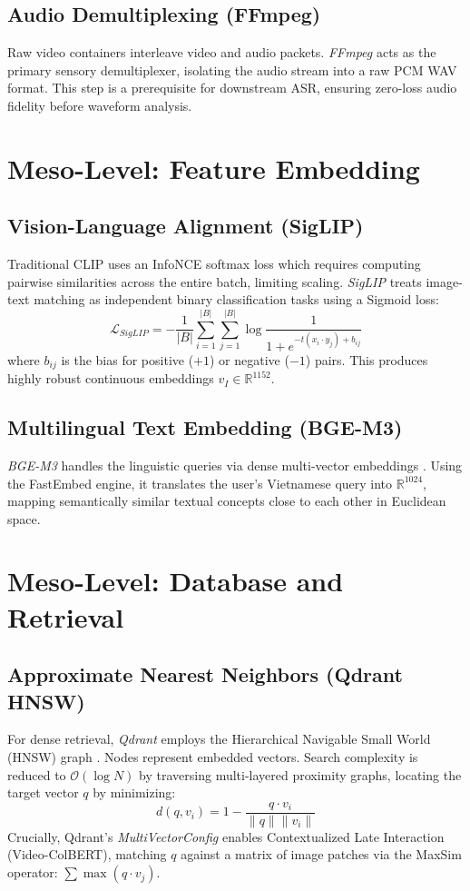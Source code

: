 \documentclass[11pt,a4paper]{article}
\begin{document}
\subsection{Audio Demultiplexing (FFmpeg)}
Raw video containers interleave video and audio packets. \textit{FFmpeg} acts as the primary sensory demultiplexer, isolating the audio stream into a raw PCM WAV format. This step is a prerequisite for downstream ASR, ensuring zero-loss audio fidelity before waveform analysis.

\section{Meso-Level: Feature Embedding}

\subsection{Vision-Language Alignment (SigLIP)}
Traditional CLIP uses an InfoNCE softmax loss which requires computing pairwise similarities across the entire batch, limiting scaling. \textit{SigLIP} \cite{zhai2023sigmoid} treats image-text matching as independent binary classification tasks using a Sigmoid loss:
\begin{equation}
\mathcal{L}_{SigLIP} = - \frac{1}{|B|} \sum_{i=1}^{|B|} \sum_{j=1}^{|B|} \log \frac{1}{1 + e^{-t(x_i \cdot y_j) + b_{ij}}}
\end{equation}
where $b_{ij}$ is the bias for positive ($+1$) or negative ($-1$) pairs. This produces highly robust continuous embeddings $v_I \in \mathbb{R}^{1152}$.

\subsection{Multilingual Text Embedding (BGE-M3)}
\textit{BGE-M3} handles the linguistic queries via dense multi-vector embeddings \cite{chen2024bge}. Using the FastEmbed engine, it translates the user's Vietnamese query into $\mathbb{R}^{1024}$, mapping semantically similar textual concepts close to each other in Euclidean space.

\section{Meso-Level: Database and Retrieval}

\subsection{Approximate Nearest Neighbors (Qdrant HNSW)}
For dense retrieval, \textit{Qdrant} employs the Hierarchical Navigable Small World (HNSW) graph \cite{malkov2018efficient}. Nodes represent embedded vectors. Search complexity is reduced to $\mathcal{O}(\log N)$ by traversing multi-layered proximity graphs, locating the target vector $q$ by minimizing:
\begin{equation}
d(q, v_i) = 1 - \frac{q \cdot v_i}{\|q\| \|v_i\|}
\end{equation}
Crucially, Qdrant's \textit{MultiVectorConfig} enables Contextualized Late Interaction (Video-ColBERT), matching $q$ against a matrix of image patches via the MaxSim operator: $\sum \max(q \cdot v_j)$.
\end{document}
